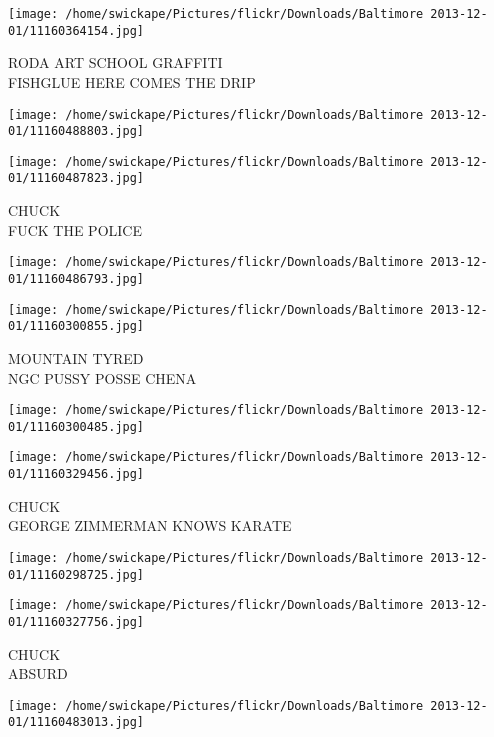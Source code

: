 \documentclass[10pt,letterpaper]{article}
\begin{document}
\vspace{0.25in}
\texttt{[image: /home/swickape/Pictures/flickr/Downloads/Baltimore 2013-12-01/11160364154.jpg]}

RODA ART SCHOOL GRAFFITI\\
FISHGLUE HERE COMES THE DRIP\\
\pagebreak

\texttt{[image: /home/swickape/Pictures/flickr/Downloads/Baltimore 2013-12-01/11160488803.jpg]}

\vspace{0.25in}
\texttt{[image: /home/swickape/Pictures/flickr/Downloads/Baltimore 2013-12-01/11160487823.jpg]}

CHUCK\\
FUCK THE POLICE\\
\pagebreak

\texttt{[image: /home/swickape/Pictures/flickr/Downloads/Baltimore 2013-12-01/11160486793.jpg]}

\vspace{0.25in}
\texttt{[image: /home/swickape/Pictures/flickr/Downloads/Baltimore 2013-12-01/11160300855.jpg]}

MOUNTAIN TYRED\\
NGC PUSSY POSSE CHENA\\
\pagebreak

\texttt{[image: /home/swickape/Pictures/flickr/Downloads/Baltimore 2013-12-01/11160300485.jpg]}

\vspace{0.25in}
\texttt{[image: /home/swickape/Pictures/flickr/Downloads/Baltimore 2013-12-01/11160329456.jpg]}

CHUCK\\
GEORGE ZIMMERMAN KNOWS KARATE\\
\pagebreak

\texttt{[image: /home/swickape/Pictures/flickr/Downloads/Baltimore 2013-12-01/11160298725.jpg]}

\vspace{0.25in}
\texttt{[image: /home/swickape/Pictures/flickr/Downloads/Baltimore 2013-12-01/11160327756.jpg]}

CHUCK\\
ABSURD\\
\pagebreak

\texttt{[image: /home/swickape/Pictures/flickr/Downloads/Baltimore 2013-12-01/11160483013.jpg]}
\end{document}
